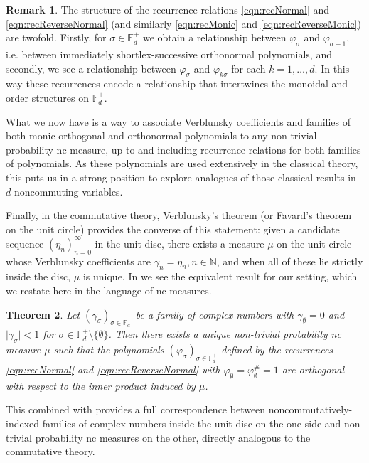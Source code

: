 \documentclass[11pt,reqno]{amsart}
\def\p{\varphi}
\def\g{\gamma}
\def\s{\sigma}
\def\NN{\mathbb{N}}
\def\FF{\mathbb{F}}
\newtheorem{theorem}{Theorem}[section]
\theoremstyle{definition}
\newtheorem{remark}[theorem]{Remark}
\numberwithin{equation}{section}
\begin{document}
\begin{remark}
    The structure of the recurrence relations \eqref{eqn:recNormal} and \eqref{eqn:recReverseNormal} (and similarly \eqref{eqn:recMonic} and \eqref{eqn:recReverseMonic}) are twofold. Firstly, for \(\s \in \FF_d^+\) we obtain a relationship between \(\p_{\s}\) and \(\p_{\s+1}\), i.e. between immediately shortlex-successive orthonormal polynomials, and secondly, we see a relationship between \(\p_\s\) and \(\p_{k\s}\) for each \(k = 1, \ldots, d\). In this way these recurrences encode a relationship that intertwines the monoidal and order structures on \(\FF_d^+\).
\end{remark}

What we now have is a way to associate Verblunsky coefficients and families of both monic orthogonal and orthonormal polynomials to any non-trivial probability nc measure, up to and including recurrence relations for both families of polynomials. As these polynomials are used extensively in the classical theory, this puts us in a strong position to explore analogues of those classical results in \(d\) noncommuting variables.

Finally, in the commutative theory, Verblunsky's theorem (or Favard's theorem on the unit circle) provides the converse of this statement: given a candidate sequence \((\eta_n)_{n=0}^{\infty}\) in the unit disc, there exists a measure \(\mu\) on the unit circle whose Verblunsky coefficients are \(\g_n = \eta_n, n \in \NN\), and when all of these lie strictly inside the disc, \(\mu\) is unique. In \cite[Theorem 5.1]{CJ02b} we see the equivalent result for our setting, which we restate here in the language of nc measures.

\begin{theorem}
    \label{thm:NCVerblunsky}
    Let \((\g_\s)_{\s \in \FF_d^+}\) be a family of complex numbers with \(\g_\emptyset = 0\) and \(\lvert \g_\s \rvert < 1\) for \(\s \in \FF_d^+ \setminus \{\emptyset\}\). Then there exists a unique non-trivial probability nc measure \(\mu\) such that the polynomials \((\p_\s)_{\s\in\FF_d^+}\) defined by the recurrences \eqref{eqn:recNormal} and \eqref{eqn:recReverseNormal} with \(\p_\emptyset = \p_\emptyset^{\#} = 1\) are orthogonal with respect to the inner product induced by \(\mu\).
\end{theorem}

This combined with  provides a full correspondence between noncommutatively-indexed families of complex numbers inside the unit disc on the one side and non-trivial probability nc measures on the other, directly analogous to the commutative theory.
\end{document}
